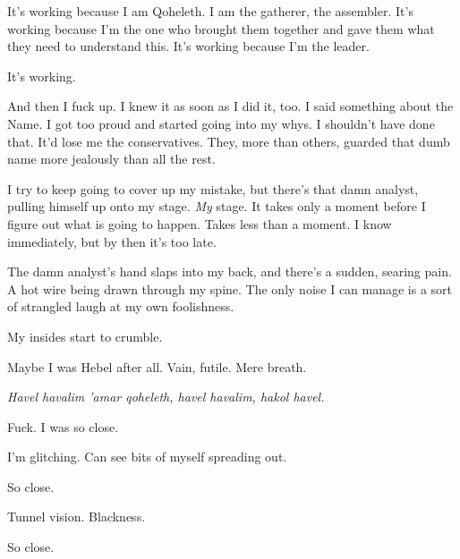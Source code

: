 It's working because I am Qoheleth. I am the gatherer, the assembler. It's working because I'm the one who brought them together and gave them what they need to understand this. It's working because I'm the leader.

It's working.

And then I fuck up. I knew it as soon as I did it, too. I said something about the Name. I got too proud and started going into my whys. I shouldn't have done that. It'd lose me the conservatives. They, more than others, guarded that dumb name more jealously than all the rest.

I try to keep going to cover up my mistake, but there's that damn analyst, pulling himself up onto my stage. \emph{My} stage. It takes only a moment before I figure out what is going to happen. Takes less than a moment. I know immediately, but by then it's too late.

The damn analyst's hand slaps into my back, and there's a sudden, searing pain. A hot wire being drawn through my spine. The only noise I can manage is a sort of strangled laugh at my own foolishness.

My insides start to crumble.

Maybe I was Hebel after all. Vain, futile. Mere breath.

\emph{Havel havalim 'amar qoheleth, havel havalim, hakol havel.}

Fuck. I was so close.

I'm glitching. Can see bits of myself spreading out.

So close.

Tunnel vision. Blackness.

So close.

